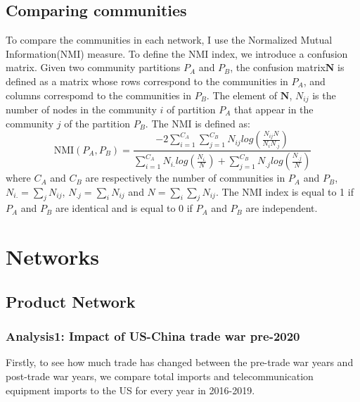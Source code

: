 \documentclass[a4paper, 12pt]{article}
\begin{document}
\subsection{Comparing communities}
To compare the communities in each network, I use the Normalized Mutual Information(NMI) measure.
To define the NMI index, we introduce a confusion matrix.
Given two community partitions $P_A$ and $P_B$, the confusion matrix$\textbf{N}$ is defined as a matrix whose rows correspond to the communities in $P_A$, and columns correspomd to the communities in $P_B$.
The element of $\textbf{N}$, $N_{ij}$ is the number of nodes in the community $i$ of partition $P_A$ that appear in the community $j$ of the partition $P_B$.
The NMI is defined as:
\begin{equation*}
    \text{NMI}(P_A, P_B) =
        \frac{
            -2\sum_{i=1}^{C_A}\sum_{j=1}^{C_B}
            {N_{ij}log\left(
                \frac{N_{ij}N}{N_iN_{.j}}
                \right)}
            }
            {\sum_{i=1}^{C_A}N_{i.}
                log\left(
                    \frac{N_{i.}}{N}
                    \right)
                +
                \sum_{j=1}^{C_B}N_{.j}
                log\left(
                    \frac{N_{.j}}{N}
                    \right)
            }
\end{equation*}
where $C_A$ and $C_B$ are respectively the number of communities in $P_A$ and $P_B$,  $N_{i.} = \sum_j{N_{ij}}$, $ N_{.j} = \sum_i{N_{ij}}$ and $N = \sum_i\sum_j{N_{ij}}$.
The NMI index is equal to 1 if $P_A$ and $P_B$ are identical and is equal to 0 if $P_A$ and $P_B$ are independent.

\newpage

\section{Networks}
\subsection{Product Network}
\subsubsection{Analysis1: Impact of US-China trade war pre-2020}
Firstly, to see how much trade has changed between the pre-trade war years and post-trade war years, we compare total imports and telecommunication equipment imports to the US for every year in 2016-2019.
\end{document}
